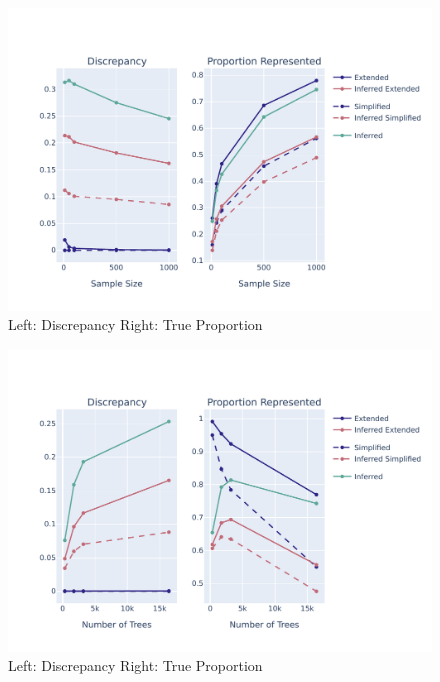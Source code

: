 \documentclass[10pt,twoside,lineno]{gsajnl}
\begin{document}
\begin{figure}
	\begin{center}
		\includegraphics[width=0.9\linewidth]{newplots_wo_ee/discrepancy_over_sample_5e7_new.pdf}
		\caption{Left: Discrepancy \newline Right: True Proportion }
	\end{center}
	\label{fig:discrepancy-over-sample}
\end{figure}

\begin{figure}
	\begin{center}
		\includegraphics[width=0.9\linewidth]{newplots_wo_ee/discrepancy_over_seqlen_1000s_new_5e7.pdf}
		\caption{Left: Discrepancy \newline Right: True Proportion}
	\end{center}
	\label{fig:discrepancy-over-seqlen}
\end{figure}
\end{document}
